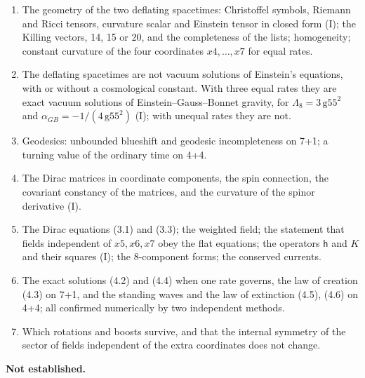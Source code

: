 \documentclass[
  10pt,
]{article}
\providecommand{\tightlist}{%
  \setlength{\itemsep}{0pt}\setlength{\parskip}{0pt}}
\begin{document}
\begin{enumerate}
\def\labelenumi{\arabic{enumi}.}
\tightlist
\item
  The geometry of the two deflating spacetimes: Christoffel symbols,
  Riemann and Ricci tensors, curvature scalar and Einstein tensor in
  closed form (I); the Killing vectors, 14, 15 or 20, and the
  completeness of the lists; homogeneity; constant curvature of the four
  coordinates \(x4,\dots,x7\) for equal rates.
\item
  The deflating spacetimes are not vacuum solutions of Einstein's
  equations, with or without a cosmological constant. With three equal
  rates they are exact vacuum solutions of Einstein--Gauss--Bonnet
  gravity, for \(\Lambda_8=3\,\mathrm{g55}^2\) and
  \(\alpha_{GB}=-1/(4\,\mathrm{g55}^2)\) (I); with unequal rates they
  are not.
\item
  Geodesics: unbounded blueshift and geodesic incompleteness on 7+1; a
  turning value of the ordinary time on 4+4.
\item
  The Dirac matrices in coordinate components, the spin connection, the
  covariant constancy of the matrices, and the curvature of the spinor
  derivative (I).
\item
  The Dirac equations (3.1) and (3.3); the weighted field; the statement
  that fields independent of \(x5,x6,x7\) obey the flat equations; the
  operators \(\mathsf h\) and \(K\) and their squares (I); the
  8-component forms; the conserved currents.
\item
  The exact solutions (4.2) and (4.4) when one rate governs, the law of
  creation (4.3) on 7+1, and the standing waves and the law of
  extinction (4.5), (4.6) on 4+4; all confirmed numerically by two
  independent methods.
\item
  Which rotations and boosts survive, and that the internal symmetry of
  the sector of fields independent of the extra coordinates does not
  change.
\end{enumerate}

\textbf{Not established.}
\end{document}
